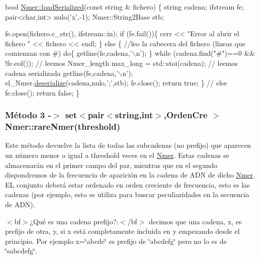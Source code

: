 \begin{DoxyCode}
\textcolor{keywordtype}{bool} \hyperlink{classNmer_a418c016bb6e04d2f699ddb694ee0221f}{Nmer::loadSerialized}(\textcolor{keyword}{const} \textcolor{keywordtype}{string} & fichero) \{
 \textcolor{keywordtype}{string} cadena;
 ifstream fe;
 pair<char,int> nulo(\textcolor{charliteral}{'x'},-1);
 Nmer::String2Base stb;
 
 fe.open(fichero.c\_str(), ifstream::in);
   \textcolor{keywordflow}{if} (fe.fail())\{
     cerr << \textcolor{stringliteral}{"Error al abrir el fichero "} << fichero << endl;
   \} 
   \textcolor{keywordflow}{else} \{
    \textcolor{comment}{//leo la cabecera del fichero (líneas que comienzan con #)}
    \textcolor{keywordflow}{do}\{ 
      getline(fe,cadena,\textcolor{charliteral}{'\(\backslash\)n'}); 
    \} \textcolor{keywordflow}{while} (cadena.find(\textcolor{stringliteral}{"#"})==0 && !fe.eof());
    \textcolor{comment}{// leemos Nmer\_length}
     max\_long = std::stoi(cadena);
     \textcolor{comment}{// leemos cadena serializada}
    getline(fe,cadena,\textcolor{charliteral}{'\(\backslash\)n'});
    el\_Nmer.\hyperlink{classktree_a66d27ffb43b3c790370b45c0a8309534}{deserialize}(cadena,nulo,\textcolor{charliteral}{';'},stb); 
    fe.close();
    \textcolor{keywordflow}{return} \textcolor{keyword}{true};
  \} \textcolor{comment}{// else}
  fe.close();
  \textcolor{keywordflow}{return} \textcolor{keyword}{false};
 \}
\end{DoxyCode}
\hypertarget{index_rare}{}\subsubsection{Método 3 -\/$>$ set$<$pair$<$string,int$>$,\+Orden\+Cre $>$ Nmer\+::rare\+Nmer(threshold)}\label{index_rare}
Este método devuelve la lista de todas las subcadenas (no prefijo) que aparecen un número menor o igual a threshold veces en el \hyperlink{classNmer}{Nmer}. Estas cadenas se almacenarán en el primer campo del par, mientras que en el segundo dispondremos de la frecuencia de aparición en la cadena de A\+DN de dicho \hyperlink{classNmer}{Nmer}. EL conjunto deberá estar ordenado en orden creciente de frecuencia, esto es las cadenas (por ejemplo, esto se utiliza para buscar peculiaridades en la secuencia de A\+DN).

$<$bf$>$¿\+Qué es una cadena prefijo?\+:$<$/bf$>$ decimos que una cadena, x, es prefijo de otra, y, si x está completamente incluida en y empezando desde el principio. Por ejemplo x=\char`\"{}abcde\char`\"{} es prefijo de \char`\"{}abcdefg\char`\"{} pero no lo es de \char`\"{}sabcdefg\char`\"{}.

